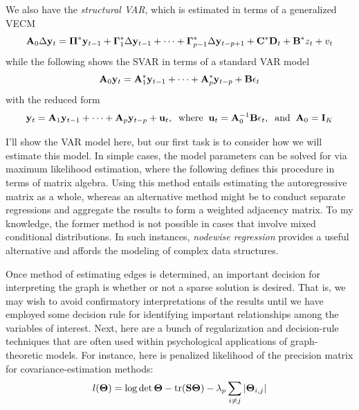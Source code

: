 We also have the \textit{structural VAR}, which is estimated in terms of a generalized VECM
\begin{equation}
    \mathbf{A}_0 \Delta \mathbf{y}_t = \bm{\Pi}^* \mathbf{y}_{t-1} + \bm{\Gamma}_1^* \Delta \mathbf{y}_{t-1} + \cdots + \bm{\Gamma}_{p-1}^* \Delta \mathbf{y}_{t - p + 1} + \mathbf{C}^* \mathbf{D}_t + \mathbf{B}^* z_t + v_t
\end{equation}
while the following shows the SVAR in terms of a standard VAR model
\begin{equation}
    \mathbf{A}_0 \mathbf{y}_t = \mathbf{A}_1^* \mathbf{y}_{t-1} + \cdots + \mathbf{A}_p^* \mathbf{y}_{t - p} + \mathbf{B} \epsilon_t
\end{equation}
with the reduced form
\begin{equation}
    \mathbf{y}_t = \mathbf{A}_1 \mathbf{y}_{t-1} + \cdots + \mathbf{A}_p \mathbf{y}_{t-p} + \mathbf{u}_t, \;\; \text{where} \;\; \mathbf{u}_t = \mathbf{A}_0^{-1} \mathbf{B} \epsilon_t, \;\; \text{and} \;\; \mathbf{A}_0 = \mathbf{I}_K
\end{equation}

I'll show the VAR model here, but our first task is to consider how we will estimate this model. In simple cases, the model parameters can be solved for via maximum likelihood estimation, where the following defines this procedure in terms of matrix algebra. Using this method entails estimating the autoregressive matrix as a whole, whereas an alternative method might be to conduct separate regressions and aggregate the results to form a weighted adjacency matrix. To my knowledge, the former method is not possible in cases that involve mixed conditional distributions. In such instances, \textit{nodewise regression} provides a useful alternative and affords the modeling of complex data structures. 

Once method of estimating edges is determined, an important decision for interpreting the graph is whether or not a sparse solution is desired. That is, we may wish to avoid confirmatory interpretations of the results until we have employed some decision rule for identifying important relationships among the variables of interest. Next, here are a bunch of regularization and decision-rule techniques that are often used within psychological applications of graph-theoretic models. For instance, here is penalized likelihood of the precision matrix for covariance-estimation methods:
\begin{equation}
    l(\bm{\Theta}) = \log \det \bm{\Theta} - \operatorname{tr}(\mathbf{S}\bm{\Theta}) - \lambda_p \sum_{i \neq j} |\bm{\Theta}_{i,j}|
\end{equation}

